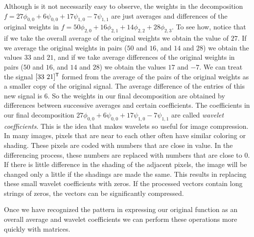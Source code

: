 Although is it not necessarily easy to observe, the weights in the decomposition $f = 27 \phi_{0,0} + 6 \psi_{0,0} + 17 \psi_{1,0} - 7 \psi_{1,1}$ are just averages and differences of the original weights in $f = 50 \phi_{2,0} + 16 \phi_{2,1} + 14 \phi_{2,2} + 28 \phi_{2,3}$. To see how, notice that if we take the overall average of the original weights we obtain the value of $27$. If we average the original weights in pairs ($50$ and $16$, and $14$ and $28$) we obtain the values $33$ and $21$, and if we take average differences of the original weights in pairs ($50$ and $16$, and $14$ and $28$) we obtain the values $17$ and $-7$. We can treat the signal $[33 \ 21]^{\tr}$ formed from the average of the pairs of the original weights as a smaller copy of the original signal. The average difference of the entries of this new signal is $6$. So the weights in our final decomposition are obtained by differences between successive averages and certain coefficients. The coefficients in our final decomposition $27 \phi_{0,0} + 6 \psi_{0,0} + 17 \psi_{1,0} - 7 \psi_{1,1}$ are called \emph{wavelet coefficients}. This is the idea that makes wavelets so useful for image compression. In many images, pixels that are near to each other often have similar coloring or shading. These pixels are coded with numbers that are close in value. In the differencing process, these numbers are replaced with numbers that are close to 0. If there is little difference in the shading of the adjacent pixels, the image will be changed only a little if the shadings are made the same. This results in replacing these small wavelet coefficients with zeros. If the processed vectors contain long strings of zeros, the vectors can be significantly compressed.  

Once we have recognized the pattern in expressing our original function as an overall average and wavelet coefficients we can perform these operations more quickly with matrices.


